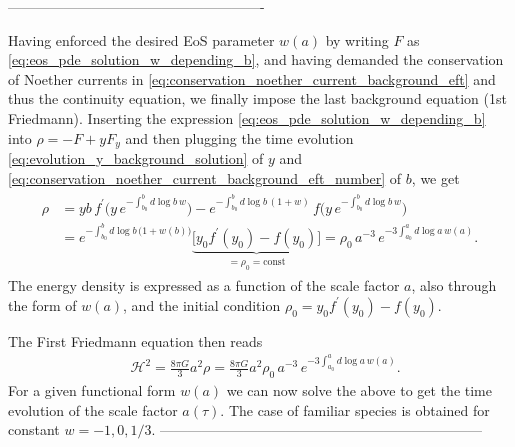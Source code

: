 {\color{gray}-------------------------------------------------------

Having enforced the desired EoS parameter $w(a)$ by writing $F$ as \eqref{eq:eos_pde_solution_w_depending_b}, and having demanded the conservation of Noether currents in \eqref{eq:conservation_noether_current_background_eft} and thus the continuity equation, we finally impose the last background equation (1st Friedmann).
Inserting the expression \eqref{eq:eos_pde_solution_w_depending_b} into $\rho=-F+yF_y$ and then plugging the time evolution \eqref{eq:evolution_y_background_solution} of $y$ and \eqref{eq:conservation_noether_current_background_eft_number} of $b$, we get
\begin{align}
\begin{aligned}
    \rho &= yb\, f^\prime\Big(y\, e^{-\int_{b_0}^bd\log\!b\, w}\Big)-e^{-\int_{b_0}^bd\log\!b\, (1+w)}\,f\Big(y\, e^{-\int_{b_0}^bd\log \!b\, w}\Big) \\
    &= e^{-\int_{b_0}^bd\log\!b\, \big(1+w(b)\big)}\underbrace{\Big[y_0f^\prime(y_0)-f(y_0)\Big]}_{=\rho_0=\text{const}} = \rho_0 \, a^{-3}\, e^{-3\int_{a_0}^a\!\!d\log\!a\, w(a)}.
\end{aligned}
\end{align}
The energy density is expressed as a function of the scale factor $a$, also through the form of $w(a)$, and the initial condition $\rho_0=y_0f^\prime(y_0)-f(y_0)$.

The First Friedmann equation then reads
\begin{align}
    &\mathcal{H}^2 = \frac{8\pi G}{3} a^2 \rho = \frac{8\pi G}{3} a^2 \rho_0 \, a^{-3}\, e^{-3\int_{a_0}^a\!\!d\log\!a\, w(a)}.
\end{align}
For a given functional form $w(a)$ we can now solve the above to get the time evolution of the scale factor $a(\tau)$.
The case of familiar species is obtained for constant $w=-1,0,1/3$.
---------------------------------------------------------------------}




